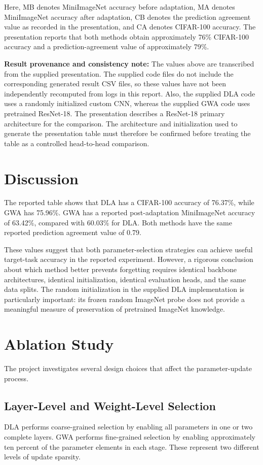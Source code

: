 \documentclass[12pt,a4paper]{report}
\begin{document}
Here, MB denotes MiniImageNet accuracy before adaptation, MA denotes
MiniImageNet accuracy after adaptation, CB denotes the prediction
agreement value as recorded in the presentation, and CA denotes
CIFAR-100 accuracy. The presentation reports that both methods obtain
approximately 76\% CIFAR-100 accuracy and a prediction-agreement value
of approximately 79\%.

\textbf{Result provenance and consistency note:} The values above are
transcribed from the supplied presentation. The supplied code files
do not include the corresponding generated result CSV files, so these
values have not been independently recomputed from logs in this report.
Also, the supplied DLA code uses a randomly initialized custom CNN,
whereas the supplied GWA code uses pretrained ResNet-18. The presentation
describes a ResNet-18 primary architecture for the comparison. The
architecture and initialization used to generate the presentation
table must therefore be confirmed before treating the table as a
controlled head-to-head comparison.

\section{Discussion}
The reported table shows that DLA has a CIFAR-100 accuracy of 76.37\%,
while GWA has 75.96\%. GWA has a reported post-adaptation MiniImageNet
accuracy of 63.42\%, compared with 60.03\% for DLA. Both methods have
the same reported prediction agreement value of 0.79.

These values suggest that both parameter-selection strategies can
achieve useful target-task accuracy in the reported experiment.
However, a rigorous conclusion about which method better prevents
forgetting requires identical backbone architectures, identical
initialization, identical evaluation heads, and the same data splits.
The random initialization in the supplied DLA implementation is
particularly important: its frozen random ImageNet probe does not
provide a meaningful measure of preservation of pretrained ImageNet
knowledge.

\section{Ablation Study}
The project investigates several design choices that affect the
parameter-update process.

\subsection{Layer-Level and Weight-Level Selection}
DLA performs coarse-grained selection by enabling all parameters in
one or two complete layers. GWA performs fine-grained selection by
enabling approximately ten percent of the parameter elements in each
stage. These represent two different levels of update sparsity.
\end{document}
